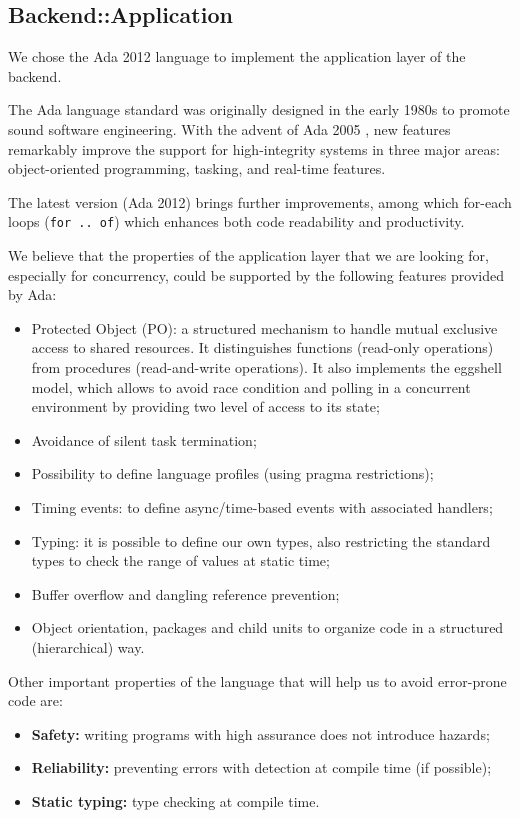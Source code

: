 \subsection{Backend::Application}
We chose the Ada 2012 language \cite{taft2012ada}
to implement the application layer of the backend.

The Ada language standard was originally designed in the early 1980s to promote
sound software engineering. With the advent of Ada 2005 \cite{taft2006ada},
new features
remarkably improve the support for high-integrity systems in three major
areas: object-oriented programming, tasking, and real-time features.

The latest version (Ada 2012) brings further improvements, among which for-each
loops (\texttt{for .. of}) which enhances both code readability and
productivity.

We believe that the properties of the application layer
that we are looking for, especially for concurrency, could be supported by the
following features provided by Ada:
\begin{itemize}
  \item Protected Object (PO): a structured mechanism to handle
        mutual exclusive access to shared resources.
        It distinguishes functions (read-only
        operations) from procedures (read-and-write operations). It also
        implements the eggshell model, which allows to avoid race condition and
        polling in a concurrent environment by providing two level of access
        to its state;
  \item Avoidance of silent task termination;
  \item Possibility to define language profiles (using pragma restrictions);
  \item Timing events: to define async/time-based events with associated
        handlers;
  \item Typing: it is possible to define our own types, also restricting
  the standard types to check the range of values at static time;
  \item Buffer overflow and dangling reference prevention;
  \item Object orientation, packages and child units to organize code in a
  structured (hierarchical) way.
\end{itemize}

Other important properties of the language that will help us to avoid
error-prone code are:
\begin{itemize}
  \item \textbf{Safety:} writing programs with high assurance does not
        introduce hazards;
  \item \textbf{Reliability:} preventing errors with detection at compile time
        (if possible);
  \item \textbf{Static typing:} type checking at compile time.
\end{itemize}

